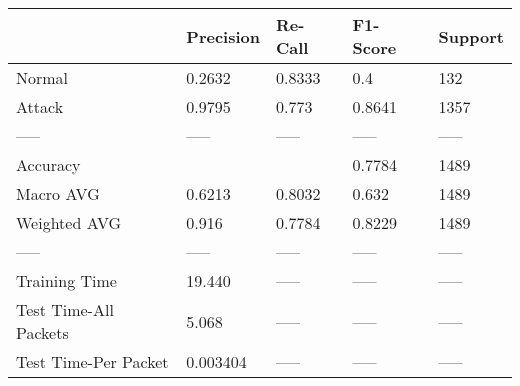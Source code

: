 \begin{tabular}{lllll}
\toprule
{} & Precision & Re-Call & F1-Score & Support \\
\midrule
Normal                &    0.2632 &  0.8333 &      0.4 &     132 \\
Attack                &    0.9795 &   0.773 &   0.8641 &    1357 \\
-----                 &     ----- &   ----- &    ----- &   ----- \\
Accuracy              &           &         &   0.7784 &    1489 \\
Macro AVG             &    0.6213 &  0.8032 &    0.632 &    1489 \\
Weighted AVG          &     0.916 &  0.7784 &   0.8229 &    1489 \\
-----                 &     ----- &   ----- &    ----- &   ----- \\
Training Time         &    19.440 &   ----- &    ----- &   ----- \\
Test Time-All Packets &     5.068 &   ----- &    ----- &   ----- \\
Test Time-Per Packet  &  0.003404 &   ----- &    ----- &   ----- \\
\bottomrule
\end{tabular}
